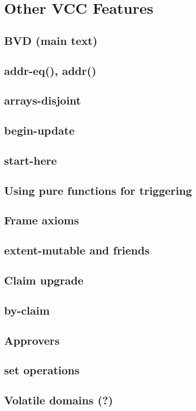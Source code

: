\section{Other VCC Features}


\subsection{BVD (main text)}
\subsection{addr-eq(), addr()}
\subsection{arrays-disjoint}
\subsection{begin-update}
\subsection{start-here}
\subsection{Using pure functions for triggering}
\subsection{Frame axioms}
\subsection{extent-mutable and friends}
\subsection{Claim upgrade}
\subsection{by-claim}
\subsection{Approvers}
\subsection{set operations}
\subsection{Volatile domains (?)}
